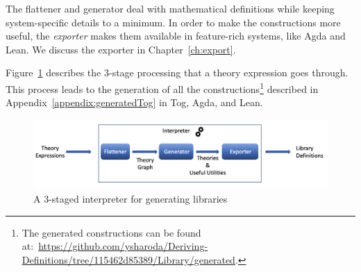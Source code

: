 The flattener and generator deal with mathematical definitions while keeping {system-specific} details to a minimum. In order to make the constructions more useful, the \emph{exporter} makes them available in feature-rich systems, like Agda and Lean. We discuss the exporter in Chapter~\ref{ch:export}. 

Figure~\ref{fig:staged-interpreter} describes the $3$-stage processing that a theory expression goes through. This process leads to the generation of all the constructions\footnote{The generated constructions can be found at:~\url{https://github.com/ysharoda/Deriving-Definitions/tree/115462d85389/Library/generated}.} described in Appendix~\ref{appendix:generatedTog} in Tog, Agda, and Lean. 
\begin{figure}
\includegraphics[scale=0.5,width=\linewidth]{figures/interpreter_detailed}
\caption{A $3$-staged interpreter for generating libraries}
\label{fig:staged-interpreter}
\end{figure} 

